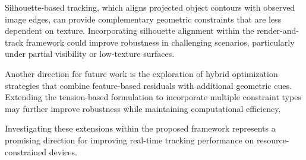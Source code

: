 Silhouette-based tracking, which aligns projected object contours with observed image edges, can provide complementary geometric constraints that are less dependent on texture. Incorporating silhouette alignment within the render-and-track framework could improve robustness in challenging scenarios, particularly under partial visibility or low-texture surfaces.

Another direction for future work is the exploration of hybrid optimization strategies that combine feature-based residuals with additional geometric cues. Extending the tension-based formulation to incorporate multiple constraint types may further improve robustness while maintaining computational efficiency.

Investigating these extensions within the proposed framework represents a promising direction for improving real-time tracking performance on resource-constrained devices.